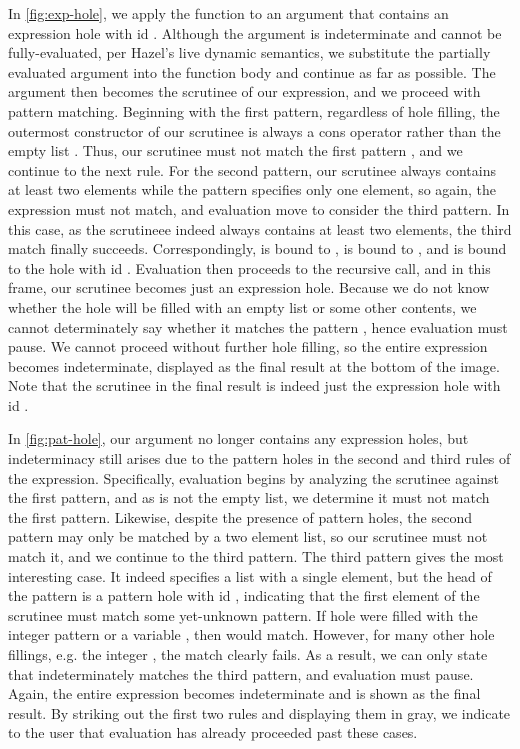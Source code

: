 In \autoref{fig:exp-hole}, we apply the function  to an argument that contains an expression hole with id . Although the argument is indeterminate and cannot be fully-evaluated, per Hazel's live dynamic semantics, we substitute the partially evaluated argument into the function body and continue as far as possible. The argument then becomes the scrutinee of our  expression, and we proceed with pattern matching. Beginning with the first pattern, regardless of hole filling, the outermost constructor of our scrutinee is always a cons operator \li{::} rather than the empty list \li{[]}. Thus, our scrutinee must not match the first pattern \li{[]}, and we continue to the next rule. For the second pattern, our scrutinee always contains at least two elements while the pattern specifies only one element, so again, the expression must not match, and evaluation move to consider the third pattern. In this case, as the scrutineee indeed always contains at least two elements, the third match finally succeeds. Correspondingly,  is bound to ,  is bound to , and  is bound to the hole with id . Evaluation then proceeds to the recursive call, and in this frame, our scrutinee becomes just an expression hole. Because we do not know whether the hole will be filled with an empty list or some other contents, we cannot determinately say whether it matches the pattern \li{[]}, hence evaluation must pause. We cannot proceed without further hole filling, so the entire  expression becomes indeterminate, displayed as the final result at the bottom of the image. Note that the scrutinee in the final result is indeed just the expression hole with id .

In \autoref{fig:pat-hole}, our argument no longer contains any expression holes, but indeterminacy still arises due to the pattern holes in the second and third rules of the  expression. Specifically, evaluation begins by analyzing the scrutinee against the first pattern, and as  is not the empty list, we determine it must not match the first pattern. Likewise, despite the presence of pattern holes, the second pattern may only be matched by a two element list, so our scrutinee must not match it, and we continue to the third pattern. The third pattern gives the most interesting case. It indeed specifies a list with a single element, but the head of the pattern is a  pattern hole with id , indicating that the first element of the scrutinee must match some yet-unknown pattern. If hole  were filled with the integer pattern  or a variable , then  would match. However, for many other hole fillings, e.g. the integer , the match clearly fails. As a result, we can only state that  indeterminately matches the third pattern, and evaluation must pause. Again, the entire  expression becomes indeterminate and is shown as the final result. By striking out the first two rules and displaying them in gray, we indicate to the user that evaluation has already proceeded past these cases.

